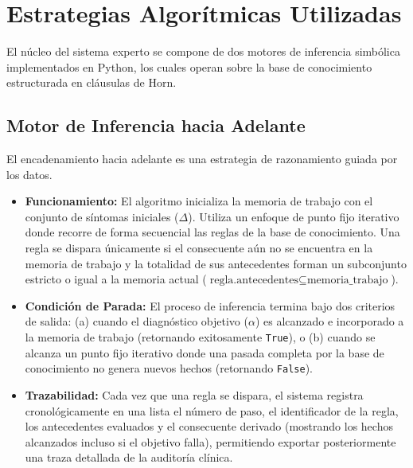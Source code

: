 \documentclass[11pt,a4paper]{article}
\begin{document}
\section{Estrategias Algorítmicas Utilizadas}

El núcleo del sistema experto se compone de dos motores de inferencia simbólica implementados en Python, los cuales operan sobre la base de conocimiento estructurada en cláusulas de Horn.

\subsection{Motor de Inferencia hacia Adelante}
El encadenamiento hacia adelante es una estrategia de razonamiento guiada por los datos. 
\begin{itemize}
    \item \textbf{Funcionamiento:} El algoritmo inicializa la memoria de trabajo con el conjunto de síntomas iniciales ($\Delta$). Utiliza un enfoque de punto fijo iterativo donde recorre de forma secuencial las reglas de la base de conocimiento. Una regla se dispara únicamente si el consecuente aún no se encuentra en la memoria de trabajo y la totalidad de sus antecedentes forman un subconjunto estricto o igual a la memoria actual ($\text{regla.antecedentes} \subseteq \text{memoria\_trabajo}$).
    \item \textbf{Condición de Parada:} El proceso de inferencia termina bajo dos criterios de salida: (a) cuando el diagnóstico objetivo ($\alpha$) es alcanzado e incorporado a la memoria de trabajo (retornando exitosamente \texttt{True}), o (b) cuando se alcanza un punto fijo iterativo donde una pasada completa por la base de conocimiento no genera nuevos hechos (retornando \texttt{False}).
    \item \textbf{Trazabilidad:} Cada vez que una regla se dispara, el sistema registra cronológicamente en una lista el número de paso, el identificador de la regla, los antecedentes evaluados y el consecuente derivado (mostrando los hechos alcanzados incluso si el objetivo falla), permitiendo exportar posteriormente una traza detallada de la auditoría clínica.
\end{itemize}
\end{document}
